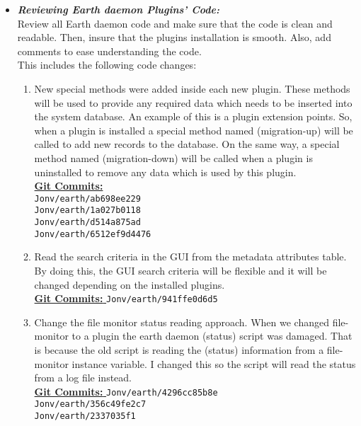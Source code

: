 \begin{itemize}
	\item \textit{\textbf{Reviewing Earth daemon Plugins' Code:}}\\
Review all Earth daemon code and make sure that the code is clean and readable. Then, insure that the plugins installation is smooth. Also, add comments to ease understanding the code.\\
This includes the following code changes:
\begin{enumerate}
\item New special methods were added inside each new plugin. These methods will be used to provide any required data which needs to be inserted into the system database. An example of this is a plugin extension points. So, when a plugin is installed a special method named (migration-up) will be called to add new records to the database. On the same way, a special method named (migration-down) will be called when a plugin is uninstalled to remove any data which is used by this plugin. \\
\underline{\textbf{Git Commits: }} \\
\texttt{Jonv/earth/ab698ee229} \\
\texttt{Jonv/earth/1a027b0118} \\ 
\texttt{Jonv/earth/d514a875ad} \\ 
\texttt{Jonv/earth/6512ef9d4476}

\item Read the search criteria in the GUI from the metadata attributes table. By doing this, the GUI search criteria will be flexible and it will be changed depending on the installed plugins.\\
\underline{\textbf{Git Commits: }} \texttt{Jonv/earth/941ffe0d6d5}



\item Change the file monitor status reading approach. When we changed file-monitor to a plugin the earth daemon (status) script was damaged. That is because the old script is reading the (status) information from a file-monitor instance variable. I changed this so the script will read the status from a log file instead.\\
\underline{\textbf{Git Commits: }} \texttt{Jonv/earth/4296cc85b8e} \\
\texttt{Jonv/earth/356c49fe2c7} \\ 
\texttt{Jonv/earth/2337035f1}

\newpage


\end{enumerate}
\end{itemize}
